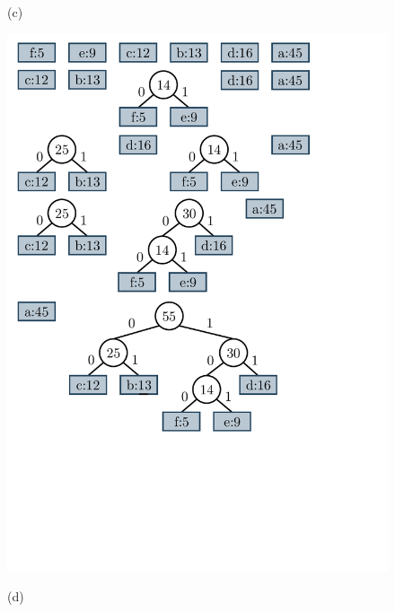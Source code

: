 \begin{figure}
\begin{minipage}{1\textwidth}
\begin{minipage}{0.45\textwidth}
    			(c)
    		\end{minipage}
    		\begin{minipage}{0.45\textwidth}
    			\centering
    			\includegraphics[scale=.4, clip, trim=10 430 160 250]{img/graphs-huffman2.pdf}
    			
    			(d)
    		\end{minipage}  
    	\end{minipage}
    	

\end{figure}
